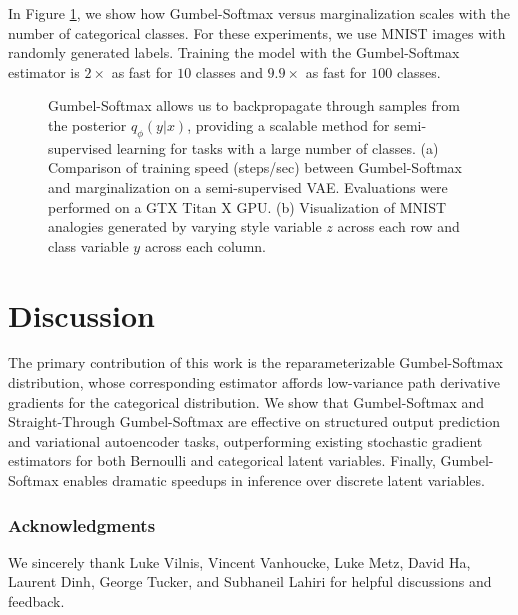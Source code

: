 \documentclass{article} %
\begin{document}
In Figure \ref{fig:ssvae_speed}, we show how Gumbel-Softmax versus marginalization scales with the number of categorical classes. For these experiments, we use MNIST images with randomly generated labels. Training the model with the Gumbel-Softmax estimator is $2\times$ as fast for $10$ classes and $9.9\times$ as fast for $100$ classes.

\begin{figure}[h]  
  \centering
  \caption{Gumbel-Softmax allows us to backpropagate through samples from the posterior $q_\phi(y|x)$, providing a scalable method for semi-supervised learning for tasks with a large number of classes. (a) Comparison of training speed (steps/sec) between Gumbel-Softmax and marginalization \citep{kingma_ssvae} on a semi-supervised VAE. Evaluations were performed on a GTX Titan X\textsuperscript{\textregistered} GPU. (b) Visualization of MNIST analogies generated by varying style variable $z$ across each row and class variable $y$ across each column.}
   \label{fig:ssvae_speed}
\end{figure}


\section{Discussion}
The primary contribution of this work is the reparameterizable Gumbel-Softmax distribution, whose corresponding estimator affords low-variance path derivative gradients for the categorical distribution. We show that Gumbel-Softmax and Straight-Through Gumbel-Softmax are effective on structured output prediction and variational autoencoder tasks, outperforming existing stochastic gradient estimators for both Bernoulli and categorical latent variables. Finally, Gumbel-Softmax enables dramatic speedups in inference over discrete latent variables.


\subsubsection*{Acknowledgments}
We sincerely thank Luke Vilnis, Vincent Vanhoucke, Luke Metz, David Ha, Laurent Dinh, George Tucker, and Subhaneil Lahiri for helpful discussions and feedback.




\appendix
\end{document}
